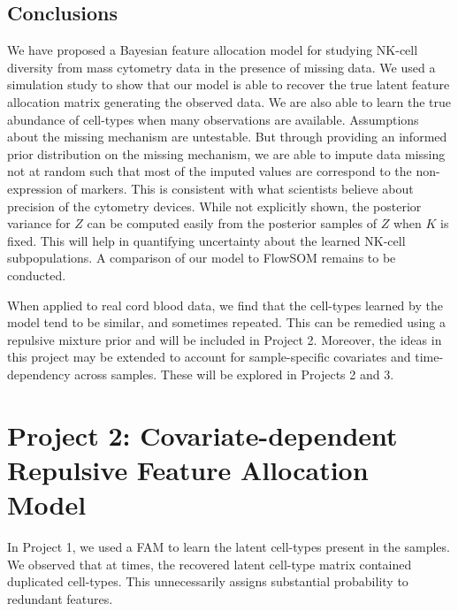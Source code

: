 \documentclass[12pt,]{article}
\begin{document}
\subsection{Conclusions}


We have proposed a Bayesian feature allocation model for studying NK-cell
diversity from mass cytometry data in the presence of missing data. We used a
simulation study to show that our model is able to recover the true latent
feature allocation matrix generating the observed data. We are also able to
learn the true abundance of cell-types when many observations are available. 
%
Assumptions about the missing mechanism are untestable. But through providing
an informed prior distribution on the missing mechanism, we are able to impute
data missing not at random such that most of the imputed values are correspond
to the non-expression of markers. This is consistent with what scientists
believe about precision of the cytometry devices.
%
While not explicitly shown, the posterior variance for $Z$ can be computed
easily from the posterior samples of $Z$ when $K$ is fixed. This will help in
quantifying uncertainty about the learned NK-cell subpopulations. 
%
A comparison of our model to FlowSOM remains to be conducted. 
%

When applied to real cord blood data, we find that the cell-types learned by
the model tend to be similar, and sometimes repeated. This can be remedied
using a repulsive mixture prior and will be included in Project 2. Moreover,
the ideas in this project may be extended to account for sample-specific
covariates and time-dependency across samples. These will be explored in
Projects 2 and 3.





\section{Project 2: Covariate-dependent Repulsive Feature Allocation Model}\label{sec:proj2}
In Project 1, we used a FAM to learn the latent cell-types present in the
samples.  We observed that at times, the recovered latent cell-type matrix
contained duplicated cell-types. This unnecessarily assigns substantial
probability to redundant features.
\end{document}

